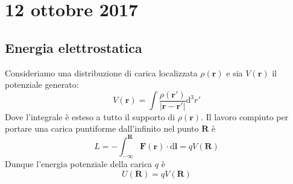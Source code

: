 \documentclass[a4paper,11pt]{book}
\newcommand{\dif}{\mathrm{d}}
\renewcommand{\vec}[1]{\mathbf{#1}}
\theoremstyle{theorem}
\theoremstyle{definition}
\begin{document}
\section{12 ottobre 2017}
\subsection{Energia elettrostatica}
Consideriamo una distribuzione di carica localizzata $\rho(\vec{r})$ e sia $V(\vec{r})$ il potenziale generato:
\[V(\vec{r})=\int\frac{\rho(\vec{r}')}{|\vec{r}-\vec{r}'|}\dif^3r'\]
Dove l'integrale è esteso a tutto il supporto di $\rho(\vec{r})$. Il lavoro compiuto per portare una carica puntiforme dall'infinito nel punto $\vec{R}$ è
\[L=-\int_{-\infty}^{\vec{R}}\vec{F}(\vec{r})\cdot\dif\vec{l}=qV(\vec{R})\]
Dunque l'energia potenziale della carica $q$ è
\[U(\vec{R})=qV(\vec{R})\]
\end{document}

